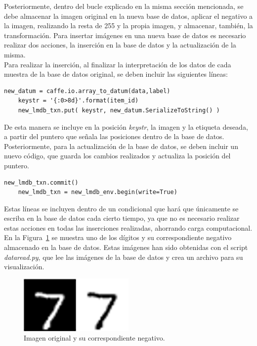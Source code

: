 Posteriormente, dentro del bucle explicado en la misma sección mencionada, se debe almacenar la imagen original en la nueva base de datos, aplicar el negativo a la imagen, realizando la resta de 255 y la propia imagen, y almacenar, también, la transformación. Para insertar imágenes en una nueva base de datos es necesario realizar dos acciones, la inserción en la base de datos y la actualización de la misma.\\

Para realizar la inserción, al finalizar la interpretación de los datos de cada muestra de la base de datos original, se deben incluir las siguientes líneas:
\vspace{10pt}
\begin{lstlisting}[frame=single]
	new_datum = caffe.io.array_to_datum(data,label)
	keystr = '{:0>8d}'.format(item_id)
	new_lmdb_txn.put( keystr, new_datum.SerializeToString() )
\end{lstlisting}
De esta manera se incluye en la posición \textit{keystr}, la imagen y la etiqueta deseada, a partir del puntero que señala las posiciones dentro de la base de datos.\\

Posteriormente, para la actualización de la base de datos, se deben incluir un nuevo código, que guarda los cambios realizados y actualiza la posición del puntero.
\vspace{10pt}
\begin{lstlisting}[frame=single]
	new_lmdb_txn.commit()
	new_lmdb_txn = new_lmdb_env.begin(write=True)
\end{lstlisting}
Estas líneas se incluyen dentro de un condicional que hará que únicamente se escriba en la base de datos cada cierto tiempo, ya que no es necesario realizar estas acciones en todas las inserciones realizadas, ahorrando carga computacional.\\

En la Figura~\ref{fig.neg} se muestra uno de los dígitos y su correspondiente negativo almacenado en la base de datos. Estas imágenes han sido obtenidas con el script \textit{dataread.py}, que lee las imágenes de la base de datos y crea un archivo para su visualización.\\

\begin{figure}[H]
	\begin{center}
		\includegraphics[width=0.5\textwidth]{figures/negativo}
		\caption{Imagen original y su correspondiente negativo.}
		\label{fig.neg}
	\end{center}
\end{figure}

